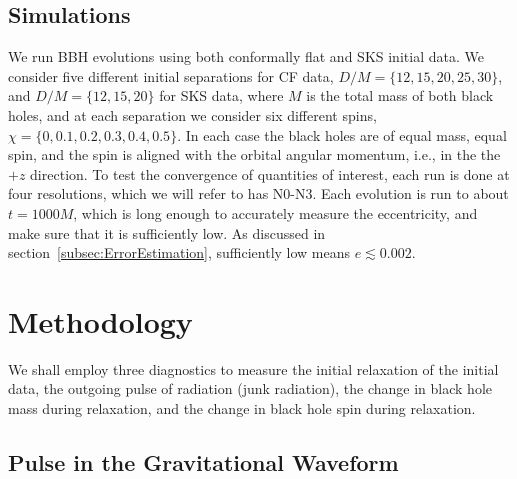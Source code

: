 \documentclass[aps,prd,amsmath,floatfix,twocolumn,superscriptaddress,nofootinbib,showpacs]{revtex4-1}
\theoremstyle{plain}
\theoremstyle{definition}
\begin{document}

\subsection{Simulations}

We run BBH evolutions using both conformally flat and SKS initial
data.  We consider five different initial separations for CF data,
$D/M=\{12,15,20,25,30\}$, and $D/M=\{12,15,20\}$ for SKS data, where $M$ is the total mass of both black
holes, and at each separation we consider  six different spins,
$\chi=\{0,0.1,0.2,0.3,0.4,0.5\}$. In each case the black holes are of
equal mass, equal spin, and the spin is aligned with the orbital
angular momentum, i.e., in the the $+z$ direction. To test the
convergence of quantities of interest, each run is done at four
resolutions, which we will refer to has N0-N3. Each evolution is
run to about $t=1000M$, which is long enough to accurately measure the
eccentricity, and make sure that it is sufficiently low. As discussed in
section~\ref{subsec:ErrorEstimation}, sufficiently low means
$e\lesssim 0.002$.

\section{Methodology}
\label{sec:Methodology}

We shall employ three diagnostics to measure the initial relaxation of
the initial data, the outgoing pulse of radiation (junk radiation),
the change in black hole mass during relaxation, and the change in
black hole spin during relaxation.



\subsection{Pulse in the Gravitational Waveform}
\end{document}
